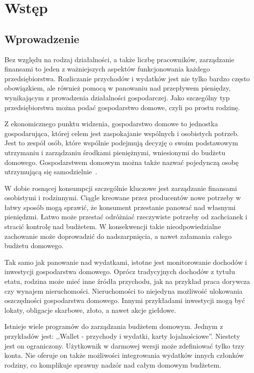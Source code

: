 \chapter{Wstęp}
\label{chap:wstep}
\section{Wprowadzenie}
\label{sec:wprowadzenie}
Bez względu na rodzaj działalności, a także liczbę pracowników, zarządzanie finansami to jeden z ważniejszych aspektów funkcjonowania każdego przedsiębiorstwa. Rozliczanie przychodów i wydatków jest nie tylko bardzo często obowiązkiem, ale również pomocą w panowaniu nad przepływem pieniędzy, wynikającym z prowadzenia działalności gospodarczej. Jako szczególny typ przedsiębiorstwa można podać gospodarstwo domowe, czyli po prostu rodzinę.

Z ekonomicznego punktu widzenia, gospodarstwo domowe to jednostka gospodarująca, której celem jest zaspokajanie wspólnych i osobistych potrzeb. Jest to zespół osób, które wspólnie podejmują decyzję o swoim podstawowym utrzymaniu i zarządzaniu środkami pieniężnymi, wniesionymi do budżetu domowego. Gospodarstwem domowym można także nazwać pojedynczą osobę utrzymującą się samodzielnie~\cite{gospodarstwo-domowe}.

W dobie rosnącej konsumpcji szczególnie kluczowe jest zarządzanie finansami osobistymi i rodzinnymi. Ciągle kreowane przez producentów nowe potrzeby w łatwy sposób mogą sprawić, że konsument przestanie panować nad własnymi pieniędzmi. Łatwo może przestać odróżniać rzeczywiste potrzeby od zachcianek i stracić kontrolę nad budżetem. W konsekwencji takie nieodpowiedzialne zachowanie może doprowadzić do nadszarpnięcia, a nawet załamania całego budżetu domowego.

Tak samo jak panowanie nad wydatkami, istotne jest monitorowanie dochodów i inwestycji gospodarstwa domowego. Oprócz tradycyjnych dochodów z tytułu etatu, rodzina może mieć inne źródła przychodu, jak na przykład praca dorywcza czy wynajem nieruchomości. Nieruchomości to niejedyna możliwość ulokowania oszczędności gospodarstwa domowego. Innymi przykładami inwestycji mogą być lokaty, obligacje skarbowe, złoto, a nawet akcje giełdowe.

Istnieje wiele programów do zarządzania budżetem domowym. Jednym z przykładów jest: ,,Wallet - przychody i wydatki, karty lojalnościowe''. Niestety jest on ograniczony. Użytkownik w darmowej wersji może zdefiniować tylko trzy konta. Nie oferuje on także możliwości integrowania wydatków innych członków rodziny, co komplikuje sprawny nadzór nad całym domowym budżetem.

